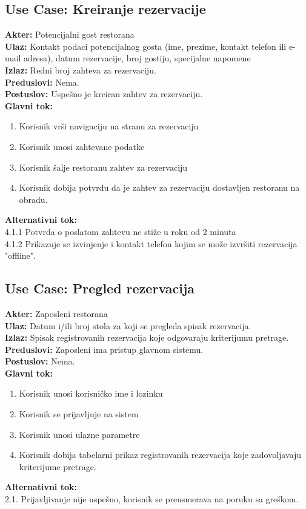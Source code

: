 \documentclass{article}
\begin{document}
\subsection{\textbf{Use Case}: Kreiranje rezervacije}
\textbf{Akter:} Potencijalni gost restorana\\
\textbf{Ulaz:} Kontakt podaci potencijalnog gosta (ime, prezime, kontakt telefon ili e-mail adresa), datum rezervacije, broj gostiju, specijalne napomene\\
\textbf{Izlaz:} Redni broj zahteva za rezervaciju.\\
\textbf{Preduslovi:} Nema.\\
\textbf{Postuslov:} Uspešno je kreiran zahtev za rezervaciju.\\
\textbf{Glavni tok:}
\begin{enumerate}
\item Korisnik vrši navigaciju na stranu za rezervaciju
\item Korisnik unosi zahtevane podatke
\item Korisnik šalje restoranu zahtev za rezervaciju
\item Korisnik dobija potvrdu da je zahtev za rezervaciju dostavljen restoranu na obradu.\\
\end{enumerate}
\textbf{Alternativni tok:}\\
		4.1.1 Potvrda o poslatom zahtevu ne stiže u roku od 2 minuta\\
		4.1.2 Prikazuje se izvinjenje i kontakt telefon kojim se može izvršiti rezervacija "offline".\\

\subsection{\textbf{Use Case}: Pregled rezervacija}
\textbf{Akter:} Zaposleni restorana\\
\textbf{Ulaz:} Datum i/ili broj stola za koji se pregleda spisak rezervacija.\\
\textbf{Izlaz:} Spisak registrovanih rezervacija koje odgovaraju kriterijumu pretrage.\\
\textbf{Preduslovi:} Zaposleni ima pristup glavnom sistemu.\\
\textbf{Postuslov:} Nema.\\
\textbf{Glavni tok:}
\begin{enumerate}
\item Korisnik unosi korisničko ime i lozinku
\item Korisnik se prijavljuje na sistem
\item Korisnik unosi ulazne parametre
\item Korisnik dobija tabelarni prikaz registrovanih rezervacija koje zadovoljavaju kriterijume pretrage.\\
\end{enumerate}
\textbf{Alternativni tok:}\\
        2.1. Prijavljivanje nije uspešno, korisnik se preusmerava na poruku sa greškom.\\
\end{document}
